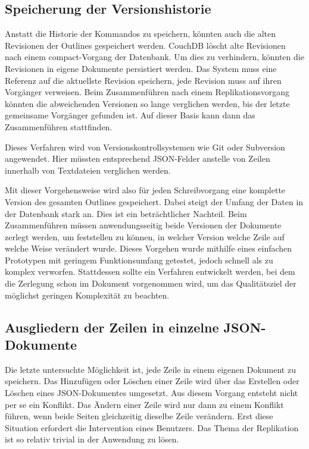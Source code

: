 \subsection{Speicherung der Versionshistorie}

Anstatt die Historie der Kommandos zu speichern, könnten auch die alten Revisionen der Outlines gespeichert werden. CouchDB löscht alte Revisionen nach einem {\selectfont compact}-Vorgang der Datenbank. Um dies zu verhindern, könnten die Revisionen in eigene Dokumente persistiert werden. Das System muss eine Referenz auf die aktuellste Revision speichern, jede Revision muss auf ihren Vorgänger verweisen. Beim Zusammenführen nach einem Replikationsvorgang könnten die abweichenden Versionen so lange verglichen werden, bis der letzte gemeinsame Vorgänger gefunden ist. Auf dieser Basis kann dann das Zusammenführen stattfinden.

Dieses Verfahren wird von Versionskontrollsystemen wie Git oder Subversion angewendet. Hier müssten entsprechend JSON-Felder anstelle von Zeilen innerhalb von Textdateien verglichen werden.  

Mit dieser Vorgehensweise wird also für jeden Schreibvorgang eine komplette Version des gesamten Outlines gespeichert. Dabei steigt der Umfang der Daten in der Datenbank stark an. Dies ist ein beträchtlicher Nachteil. Beim Zusammenführen müssen anwendungsseitig beide Versionen der Dokumente zerlegt werden, um feststellen zu können, in welcher Version welche Zeile auf welche Weise verändert wurde. Dieses Vorgehen wurde mithilfe eines einfachen Prototypen mit geringem Funktionsumfang getestet, jedoch schnell als zu komplex verworfen. Stattdessen sollte ein Verfahren entwickelt werden, bei dem die Zerlegung schon im Dokument vorgenommen wird, um das Qualitätsziel der möglichst geringen Komplexität zu beachten.

\subsection{Ausgliedern der Zeilen in einzelne JSON-Dokumente}

Die letzte untersuchte Möglichkeit ist, jede Zeile in einem eigenen Dokument zu speichern. Das Hinzufügen oder Löschen einer Zeile wird über das Erstellen oder Löschen eines JSON-Dokumentes umgesetzt. Aus diesem Vorgang entsteht nicht per se ein Konflikt. Das Ändern einer Zeile wird nur dann zu einem Konflikt führen, wenn beide Seiten gleichzeitig dieselbe Zeile verändern. Erst diese Situation erfordert die Intervention eines Benutzers. Das Thema der Replikation ist so relativ trivial in der Anwendung zu lösen. 

